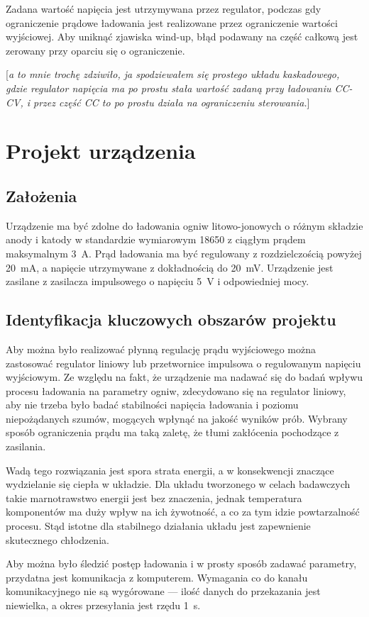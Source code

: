 \documentclass[polish,engineer]{polsl-msth}
\newcommand{\remark}[1]{{[\color{GREEN}\emph{\footnotesize #1}{}]}}
\begin{document}
Zadana wartość napięcia jest utrzymywana przez regulator, podczas gdy ograniczenie prądowe ładowania jest realizowane przez ograniczenie wartości wyjściowej. Aby uniknąć zjawiska wind-up, błąd podawany na część całkową jest zerowany przy oparciu się o ograniczenie.

\remark{a to mnie trochę zdziwiło, ja spodziewałem się prostego układu kaskadowego,
gdzie regulator napięcia ma po prostu stała wartość zadaną przy ładowaniu
CC-CV, i przez część CC to po prostu działa na ograniczeniu sterowania.}

\chapter{Projekt urządzenia}
\section{Założenia}
Urządzenie ma być zdolne do ładowania ogniw litowo-jonowych o różnym składzie anody i katody w standardzie wymiarowym 18650 z ciągłym prądem maksymalnym 3~A. Prąd ładowania ma być regulowany z rozdzielczością powyżej 20~mA, a napięcie utrzymywane z dokładnością do 20~mV. Urządzenie jest zasilane z zasilacza impulsowego o napięciu 5~V i odpowiedniej mocy.
\section{Identyfikacja kluczowych obszarów projektu}
Aby można było realizować płynną regulację prądu wyjściowego można zastosować regulator liniowy lub przetwornice impulsowa o regulowanym napięciu wyjściowym. Ze względu na fakt, że urządzenie ma nadawać się do badań wpływu procesu ładowania na parametry ogniw, zdecydowano się na regulator liniowy, aby nie trzeba było badać stabilności napięcia ładowania i poziomu niepożądanych szumów, mogących wpłynąć na jakość wyników prób. Wybrany sposób ograniczenia prądu ma taką zaletę, że tłumi zakłócenia pochodzące z zasilania.

Wadą tego rozwiązania jest spora strata energii, a w konsekwencji znaczące wydzielanie się ciepła w układzie. Dla układu tworzonego w celach badawczych takie marnotrawstwo energii jest bez znaczenia, jednak temperatura komponentów ma duży wpływ na ich żywotność, a co za tym idzie powtarzalność procesu. Stąd istotne dla stabilnego działania układu jest zapewnienie skutecznego chłodzenia.

Aby można było śledzić postęp ładowania i w prosty sposób zadawać parametry, przydatna jest komunikacja z komputerem. Wymagania co do kanału komunikacyjnego nie są wygórowane --- ilość danych do przekazania jest niewielka, a okres przesyłania jest rzędu 1~s.
\end{document}
